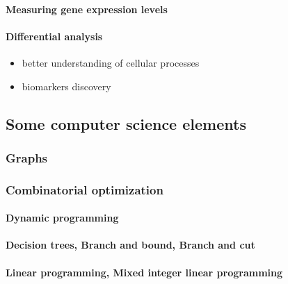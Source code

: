 			\paragraph{Measuring gene expression levels}

			\paragraph{Differential analysis}

				\begin{itemize}
					\item better understanding of cellular processes
					\item biomarkers discovery
				\end{itemize}


	\subsection{Some computer science elements}

	\subsubsection{Graphs}

	\subsubsection{Combinatorial optimization}
		\paragraph{Dynamic programming}
		\paragraph{Decision trees, Branch and bound, Branch and cut}
		\paragraph{Linear programming, Mixed integer linear programming}

